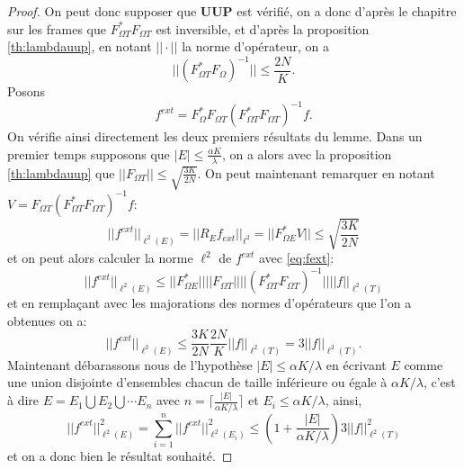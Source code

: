 \begin{proof}
	On peut donc supposer que \textbf{UUP} est vérifié, on a donc d'après le chapitre sur les frames que $F_{\Omega T}^* F_{\Omega T}$ est inversible, et d'après la proposition \ref{th:lambdauup}, en notant $||\cdot||$ la norme d'opérateur, on a
	\begin{equation}
		||(F_{\Omega T}^*F_\Omega)^{-1}|| \leq \frac{2N}{K}.
	\end{equation}
	Posons
	\begin{equation}\label{eq:fext}
		f^{ext} = F_\Omega^* F_{\Omega T} (F_{\Omega T}^* F_{\Omega T})^{-1} f.
	\end{equation}	
	On vérifie ainsi directement les deux premiers résultats du lemme.
	Dans un premier temps supposons que $|E|\leq\frac{\alpha K}{\lambda}$, on a alors avec la proposition \ref{th:lambdauup} que $||F_{\Omega T}||\leq\sqrt{\frac{3K}{2N}}$.
	On peut maintenant remarquer en notant $V=F_{\Omega T}(F_{\Omega T}^* F_{\Omega T})^{-1}f$: 
	\begin{equation}
		||f^{ext}||_{\ell^2(E)} = ||R_E f_{ext}||_{\ell^2} = ||F_{\Omega E}^* V|| \leq \sqrt{\frac{3K}{2N}}
	\end{equation}
	et on peut alors calculer la norme $\ell^2$ de $f^{ext}$ avec \ref{eq:fext}:
	\begin{equation}
		||f^{ext}||_{\ell^2(E)} \leq ||F_{\Omega E}^*|| ||F_{\Omega T}|| ||(F_{\Omega T}^* F_{\Omega T})^{-1}|| ||f||_{\ell^2(T)}
	\end{equation}
	et en remplaçant avec les majorations des normes d'opérateurs que l'on a obtenues on a:
	\begin{equation}
		||f^{ext}||_{\ell^2(E)} \leq \frac{3K}{2N} \frac{2N}{K}||f||_{\ell^2(T)} = 3 ||f||_{\ell^2(T)}.
	\end{equation}
	Maintenant débarassons nous de l'hypothèse $|E| \leq \alpha K / \lambda$ en écrivant $E$ comme une union disjointe d'ensembles chacun de taille inférieure ou égale à $\alpha K/\lambda$, c'est à dire $E=E_1\bigcup E_2 \bigcup \cdots E_{n}$ avec $n=\lceil \frac{|E|}{\alpha K /\lambda} \rceil$ et $E_i \leq \alpha K /\lambda$, ainsi,
	\begin{equation}
		||f^{ext}||_{\ell^2(E)}^2 = \sum_{i=1}^{n} ||f^{ext}||_{\ell^2(E_i)}^2 \leq (1+\frac{|E|}{\alpha K/\lambda} )3||f||_{\ell^2(T)}^2
	\end{equation}
	et on a donc bien le résultat souhaité.
\end{proof}

